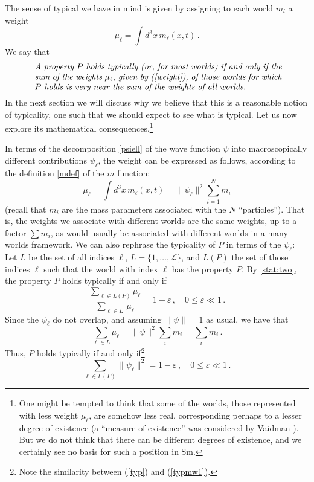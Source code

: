 \documentclass[12pt]{article}
\newcommand{\Lnum}{\mathscr{L}}
\newcommand{\Lset}{L}
\begin{document}
The sense of typical we have in mind is given by assigning to each world $m_l$ a weight
\begin{equation}\label{weight}
\mu_{\ell} = \int d^3x \, m_\ell(x,t)\,.
\end{equation}
We say that 
\begin{equation}
\mbox{
\begin{minipage}{0.85\textwidth}
  \emph{A property $P$ holds typically (or, for most worlds) 
  if and only if the sum of the weights $\mu_{\ell}$, given by (\ref{weight}),  
  of those worlds for which $P$ holds is 
  very near the sum of the weights of all worlds.}
\end{minipage}}
\label{stat:two}
\end{equation}
In the next section we will discuss why we believe that this is a reasonable notion of typicality, one such that we should expect to see what is typical. Let us now explore its mathematical consequences.\footnote{One might be tempted to think that some of the worlds, those represented with less weight $\mu_{\ell}$,
are somehow less real, corresponding perhaps to a lesser degree of existence (a ``measure of existence'' was considered by Vaidman \cite{vaidman1}). But we do not think that there can be different degrees of existence, and we certainly see no basis for such a position in Sm.}

In terms of the decomposition \eqref{psiell} of the wave function $\psi$ into macroscopically different contributions $\psi_\ell$, the weight can be expressed as follows, according to the definition \eqref{mdef} of the $m$ function:
\begin{equation}\label{weightell}
\mu_{\ell} = \int d^3x \, m_\ell(x,t) = \|\psi_\ell\|^2 \sum_{i=1}^N m_i
\end{equation}
(recall that $m_i$ are the mass parameters associated with the $N$ ``particles'').
That is, the weights we associate with different worlds are the same weights, up to a factor $\sum m_i$, as would usually be associated with different worlds in a many-worlds framework. We can also rephrase the typicality of $P$ in terms of the $\psi_\ell$: Let $\Lset$ be the set of all indices $\ell$, $\Lset=\{1,\ldots,\Lnum\}$, and $\Lset(P)$ the set of those indices $\ell$ such that the world with index $\ell$ has the property $P$. By \eqref{stat:two}, the property $P$ holds typically if and only if
\begin{equation}\label{typmw}
\frac{\sum\limits_{\ell\in \Lset(P)}  \mu_{\ell}}
{\sum\limits_{\ell \in \Lset}  \, \mu_{\ell} } = 1-\varepsilon\,, 
\quad 0\leq \varepsilon \ll 1\,.
\end{equation}
Since the $\psi_\ell$ do not overlap, and assuming $\|\psi\|=1$ as usual, we have that
\[
\sum_{\ell \in \Lset} \mu_{\ell}  = \|\psi\|^2 \sum_i m_i = \sum_i m_i\,.
\]
Thus, $P$ holds typically if and only if\footnote{Note the similarity  between (\ref{typ}) and (\ref{typmw1}).}
\begin{equation}
\sum_{\ell\in \Lset(P)} \|\psi_\ell\|^2 = 1-\varepsilon\,,
\quad 0\leq \varepsilon \ll 1\,.
\label{typmw1}
\end{equation}
\end{document}
